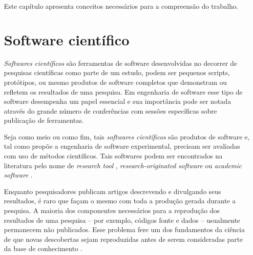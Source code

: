 
{Este capítulo apresenta conceitos necessários para a compreensão do trabalho.}
\label{fundamentacao}

\section{Software científico}

{\it Softwares científicos} são ferramentas de software desenvolvidas no decorrer de
pesquisas científicas como parte de um estudo, podem ser pequenos scripts,
protótipos, ou mesmo produtos de software completos que demonstram ou refletem
os resultados de uma pesquisa. Em engenharia de software esse tipo de software
desempenha um papel essencial e sua importância pode ser notada através do
grande número de conferências com sessões específicas sobre publicação de
ferramentas.

Seja como meio ou como fim, tais {\it softwares científicos} são produtos de
software e, tal como propõe a engenharia de software experimental, precisam ser
avaliadas com uso de métodos científicos. Tais softwares podem ser encontrados
na literatura pelo nome de {\it research tool} \cite{Portillo12}, {\it
research-originated software} \cite{Kon2011} ou {\it academic software}
\cite{allen2017engineering}.


Enquanto pesquisadores publicam artigos descrevendo e divulgando seus
resultados, é raro que façam o mesmo com toda a produção gerada durante a
pesquisa. A maioria dos componentes necessários para a reprodução dos
resultados de uma pesquisa -- por exemplo, códigos fonte e dados -- usualmente
permanecem não publicados. Esse problema fere um dos fundamentos
da ciência de que novas descobertas sejam reproduzidas antes de serem
consideradas parte da base de conhecimento \cite{Stodden2009}.

